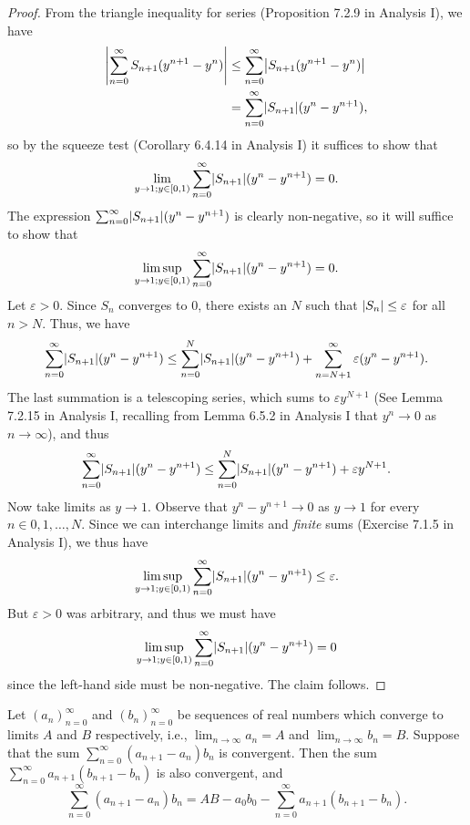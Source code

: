 \begin{proof}
  From the triangle inequality for series (Proposition 7.2.9 in Analysis I), we have
  \begin{align*}
    \abs{\sum_{n = 0}^\infty S_{n + 1} (y^{n + 1} - y^n)} & \leq \sum_{n = 0}^\infty \abs{S_{n + 1} (y^{n + 1} - y^n)} \\
                                                          & = \sum_{n = 0}^\infty \abs{S_{n + 1}} (y^n - y^{n + 1}),
  \end{align*}
  so by the squeeze test (Corollary 6.4.14 in Analysis I) it suffices to show that
  \[
    \lim_{y \to 1 ; y \in [0, 1)} \sum_{n = 0}^\infty \abs{S_{n + 1}} (y^n - y^{n + 1}) = 0.
  \]
  The expression \(\sum_{n = 0}^\infty \abs{S_{n + 1}} (y^n - y^{n + 1})\) is clearly non-negative, so it will suffice to show that
  \[
    \limsup_{y \to 1 ; y \in [0, 1)} \sum_{n = 0}^\infty \abs{S_{n + 1}} (y^n - y^{n + 1}) = 0.
  \]
  Let \(\varepsilon > 0\).
  Since \(S_n\) converges to \(0\), there exists an \(N\) such that \(\left\lvert S_n\right\rvert \leq \varepsilon\) for all \(n > N\).
  Thus, we have
  \[
    \sum_{n = 0}^\infty \abs{S_{n + 1}} (y^n - y^{n + 1}) \leq \sum_{n = 0}^N \abs{S_{n + 1}} (y^n - y^{n + 1}) + \sum_{n = N + 1}^\infty \varepsilon (y^n - y^{n + 1}).
  \]
  The last summation is a telescoping series, which sums to \(\varepsilon y^{N + 1}\) (See Lemma 7.2.15 in Analysis I, recalling from Lemma 6.5.2 in Analysis I that \(y^n \to 0\) as \(n \to \infty\)), and thus
  \[
    \sum_{n = 0}^\infty \abs{S_{n + 1}} (y^n - y^{n + 1}) \leq \sum_{n = 0}^N \abs{S_{n + 1}} (y^n - y^{n + 1}) + \varepsilon y^{N + 1}.
  \]
  Now take limits as \(y \to 1\).
  Observe that \(y^n - y^{n + 1} \to 0\) as \(y \to 1\) for every \(n \in 0, 1, \dots, N\).
  Since we can interchange limits and \emph{finite} sums (Exercise 7.1.5 in Analysis I), we thus have
  \[
    \limsup_{y \to 1 ; y \in [0, 1)} \sum_{n = 0}^\infty \abs{S_{n + 1}} (y^n - y^{n + 1}) \leq \varepsilon.
  \]
  But \(\varepsilon > 0\) was arbitrary, and thus we must have
  \[
    \limsup_{y \to 1 ; y \in [0, 1)} \sum_{n = 0}^\infty \abs{S_{n + 1}} (y^n - y^{n + 1}) = 0
  \]
  since the left-hand side must be non-negative.
  The claim follows.
\end{proof}

\begin{lem}\label{ii:4.3.2}
  Let \((a_n)_{n = 0}^\infty\) and \((b_n)_{n = 0}^\infty\) be sequences of real numbers which converge to limits \(A\) and \(B\) respectively, i.e., \(\lim_{n \to \infty} a_n = A\) and \(\lim_{n \to \infty} b_n = B\).
  Suppose that the sum \(\sum_{n = 0}^\infty (a_{n + 1} - a_n) b_n\) is convergent.
  Then the sum \(\sum_{n = 0}^\infty a_{n + 1} (b_{n + 1} - b_n)\) is also convergent, and
  \[
    \sum_{n = 0}^\infty (a_{n + 1} - a_n) b_n = AB - a_0 b_0 - \sum_{n = 0}^\infty a_{n + 1} (b_{n + 1} - b_n).
  \]
\end{lem}


